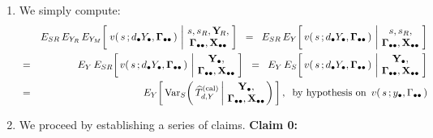 \proof
\renewcommand{\theenumi}{\roman{enumi}}
\renewcommand{\labelenumi}{\mbox{}\;\;\,(\theenumi)$\quad$}
\begin{enumerate}
\item
    We simply compute:
    \begin{eqnarray*}
    &&
        E_{SR}\,
        E_{Y_{R}}\,
        E_{Y_{M}}\!\left[\;
            v(\,s\,;\dYdot,\Gdotdot\,)
            \,\left\vert\!
            \begin{array}{c} s,s_{R},\YsubR, \\ \Gdotdot,\Xobs \end{array}
            \right.
            \!\!\right]
    \;\; = \;\;
        E_{SR}\,
        E_{Y}\!\left[\,
            v(\,s\,;\dYdot,\Gdotdot\,)
            \,\left\vert\!
            \begin{array}{c} s,s_{R}, \\ \Gdotdot,\Xobs \end{array}
            \right.
            \!\!\right]
    \\
    & = &
        E_{Y}\,
        E_{SR}\!\left[\,
            v(\,s\,;\dYdot,\Gdotdot\,)
            \,\left\vert\!
            \begin{array}{c} \Ydot, \\ \Gdotdot,\Xobs \end{array}
            \right.
            \!\!\right]
    \;\; = \;\;
        E_{Y}\,
        E_{S}\!\left[\,
            v(\,s\,;\dYdot,\Gdotdot\,)
            \,\left\vert\!
            \begin{array}{c} \Ydot, \\ \Gdotdot,\Xobs \end{array}
            \right.
            \!\!\right]
    \\
    & = &
        E_{Y}\!\left[\,
            \Var_{S}\!\left(\,
                \widehat{T}^{\textnormal{(cal)}}_{d,Y}
                \left\vert\!
                \begin{array}{c} \Ydot, \\ \Gdotdot,\Xobs \end{array}
                \right.
                \!\!\!\right)
            \,\right],
    \;\;
    \textnormal{by hypothesis on \,$v(\,s\,;y_{\bullet},\Gamma_{\bullet\bullet}\,)$}
    \end{eqnarray*}
\item
    We proceed by establishing a series of claims.
    \vskip 0.1cm
    \noindent
    \textbf{Claim 0:}\quad
    \begin{eqnarray*}

\end{eqnarray*}
\end{enumerate}
